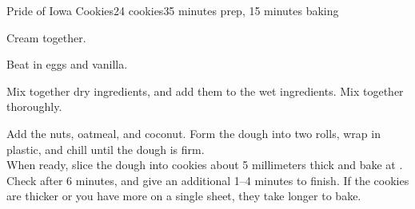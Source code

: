 \documentclass[../Cookbook.tex]{subfiles}
\begin{document}
\begin{recipe}{Pride of Iowa Cookies}{24 cookies}{35 minutes prep, 15 minutes baking}

	Cream together.

	Beat in eggs and vanilla.

	Mix together dry ingredients, and add them to the wet ingredients. Mix together thoroughly.

	Add the nuts, oatmeal, and coconut. Form the dough into two rolls, wrap in plastic, and chill until the dough is firm.\\
	When ready, slice the dough into cookies about 5 millimeters thick and bake at . Check after 6 minutes, and give an additional 1--4 minutes to finish. If the cookies are thicker or you have more on a single sheet, they take longer to bake.

\end{recipe}
\end{document}
